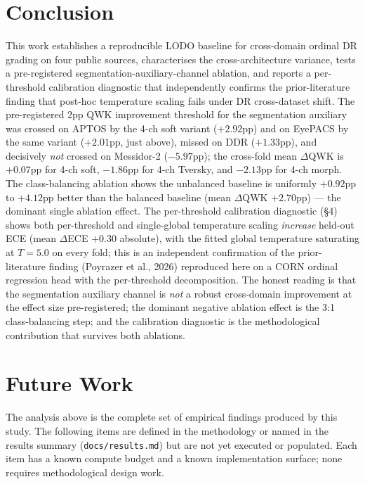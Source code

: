 \documentclass[11pt]{article}
\begin{document}
\section{Conclusion}

This work establishes a reproducible LODO baseline for cross-domain ordinal DR grading on four public sources, characterises the cross-architecture variance, tests a pre-registered segmentation-auxiliary-channel ablation, and reports a per-threshold calibration diagnostic that independently confirms the prior-literature finding that post-hoc temperature scaling fails under DR cross-dataset shift. The pre-registered 2pp QWK improvement threshold for the segmentation auxiliary was crossed on APTOS by the 4-ch soft variant ($+2.92$pp) and on EyePACS by the same variant ($+2.01$pp, just above), missed on DDR ($+1.33$pp), and decisively \emph{not} crossed on Messidor-2 ($-5.97$pp); the cross-fold mean $\Delta$QWK is $+0.07$pp for 4-ch soft, $-1.86$pp for 4-ch Tversky, and $-2.13$pp for 4-ch morph. The class-balancing ablation shows the unbalanced baseline is uniformly $+0.92$pp to $+4.12$pp better than the balanced baseline (mean $\Delta$QWK $+2.70$pp) --- the dominant single ablation effect. The per-threshold calibration diagnostic (\S4) shows both per-threshold and single-global temperature scaling \emph{increase} held-out ECE (mean $\Delta$ECE $+0.30$ absolute), with the fitted global temperature saturating at $T = 5.0$ on every fold; this is an independent confirmation of the prior-literature finding (Poyrazer et al., 2026) reproduced here on a CORN ordinal regression head with the per-threshold decomposition. The honest reading is that the segmentation auxiliary channel is \emph{not} a robust cross-domain improvement at the effect size pre-registered; the dominant negative ablation effect is the 3:1 class-balancing step; and the calibration diagnostic is the methodological contribution that survives both ablations.

\section{Future Work}
\label{sec:future-work}

The analysis above is the complete set of empirical findings produced by this study. The following items are defined in the methodology or named in the results summary (\texttt{docs/results.md}) but are not yet executed or populated. Each item has a known compute budget and a known implementation surface; none requires methodological design work.
\end{document}
